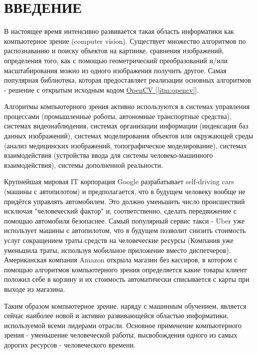 \chapter*{ВВЕДЕНИЕ}

В настоящее время интенсивно развивается такая область информатики как компьютерное зрение (computer vision). Существует множество алгоритмов по распознаванию и поиску объектов на картинке, сравнения изображений, определения того, как с помощью геометрический преобразований и/или масштабирования можно из одного изображения получить другое. Самая популярная библиотека, которая предоставляет реализации основных алгоритмов - решение с открытым исходным кодом \hyperref[itm:opencv]{OpenCV [\ref{itm:opencv}]}.

Алгоритмы компьютерного зрения активно используются в системах управления процессами (промышленные роботы, автономные транспортные средства), системах видеонаблюдения, системах организации информации (индексация баз данных изображений), системах моделирования объектов или окружающей среды (анализ медицинских изображений, топографическое моделирование), системах взаимодействия (устройства ввода для системы человеко-машинного взаимодействия), системы дополненной реальности.

Крупнейшая мировая IT корпорация Google разрабатывает self-driving cars (машины с автопилотом) и предполагается, что в будущем человеку вообще не придётся управлять автомобилем. Это должно уменьшить число происшествий исключая "человеческий фактор" и, соответственно, сделать передвижение с помощью автомобиля безопаснее. Самый популярный сервис такси - Uber уже использует машины с автопилотом, что в будущем позволит снизить стоимость услуг сокращением траты средств на человеческие ресурсы (Компания уже уменьшила траты, используя мобильное приложение вместо диспетчеров). Американская компания Amazon открыла магазин без кассиров, в котором с помощью алгоритмов компьютерного зрения определяется какие товары клиент положил себе в корзину и их стоимость автоматически списывается с карты при выходе из магазина.

Таким образом компьютерное зрение, наряду с машинным обучением, является сейчас наиболее новой и активно развивающейся областью информатики, используемой всеми лидерами отрасли. Основное применение компьютерного зрения - уменьшение человеческой работы, высвобождения одного из самых дорогих ресурсов - человеческого времени.

\newpage